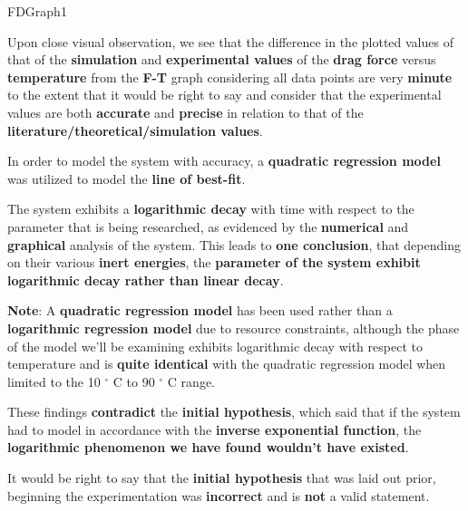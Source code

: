 
{FDGraph1}            
            
{Upon close visual observation, we see that the difference in the plotted values of that of the \textbf{simulation} and \textbf{experimental values} of the \textbf{drag force} versus \textbf{temperature} from the \textbf{F-T} graph considering all data points are very \textbf{minute} to the extent that it would be right to say and consider that the experimental values are both \textbf{accurate} and \textbf{precise} in relation to that of the \textbf{literature/theoretical/simulation values}.}

{In order to model the system with accuracy, a \textbf{quadratic regression model} was utilized to model the \textbf{line of best-fit}.}
        
{The system exhibits a \textbf{logarithmic decay} with time with respect to the parameter that is being researched, as evidenced by the \textbf{numerical} and \textbf{graphical} analysis of the system. This leads to \textbf{one conclusion}, that depending on their various \textbf{inert energies}, the \textbf{parameter of the system exhibit logarithmic decay rather than linear decay}.}

{\textbf{Note}: A \textbf{quadratic regression model} has been used rather than a \textbf{logarithmic regression model} due to resource constraints, although the phase of the model we'll be examining exhibits logarithmic decay with respect to temperature and is \textbf{quite identical} with the quadratic regression model when limited to the 10 $^\circ$ C to 90 $^\circ$ C range.}
	 
{These findings \textbf{contradict} the \textbf{initial hypothesis}, which said that if the system had to model in accordance with the \textbf{inverse exponential function}, the \textbf{logarithmic phenomenon we have found wouldn't have existed}.}        
        

{It would be right to say that the \textbf{initial hypothesis} that was laid out prior, beginning the experimentation was \textbf{incorrect} and is \textbf{not} a valid statement.}        
    
    

